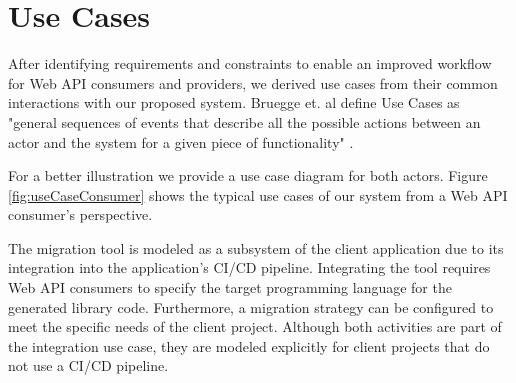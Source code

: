 \section{Use Cases}
\label{sec:UseCases}

After identifying requirements and constraints to enable an improved workflow for Web API consumers and providers, we derived use cases from their common interactions with our proposed system. Bruegge et. al define Use Cases as "general sequences of events that describe all the possible actions between an actor and the system for a given piece of functionality" \cite{bruegge_object-oriented_2010}.

For a better illustration we provide a use case diagram for both actors. Figure \ref{fig:useCaseConsumer} shows the typical use cases of our system from a Web API consumer's perspective.

\begin{figure}[h]
\end{figure}

The migration tool is modeled as a subsystem of the client application due to its integration into the application's CI/CD pipeline. Integrating the tool requires Web API consumers to specify the target programming language for the generated library code. Furthermore, a migration strategy can be configured to meet the specific needs of the client project. Although both activities are part of the integration use case, they are modeled explicitly for client projects that do not use a CI/CD pipeline. 

